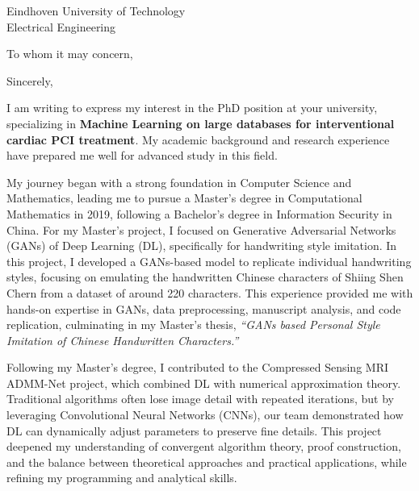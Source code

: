 \documentclass[11pt,a4paper, final]{moderncv}
\newcommand{\spacesubsection}{\vspace{0.2cm}}
\begin{document}
{Eindhoven University of Technology\\
Electrical Engineering}
\date{\today}
\opening{To whom it may concern,}
\closing{Sincerely,}
\makelettertitle
I am writing to express my interest in the PhD position at your university, 
specializing in \textbf{Machine Learning on large databases for interventional cardiac PCI treatment}. 
My academic background and research experience have prepared me well for advanced study in this field. 

My journey began with a strong foundation in Computer Science and Mathematics, 
leading me to pursue a Master's degree in Computational Mathematics in 2019, 
following a Bachelor's degree in Information Security in China. 
For my Master's project, I focused on Generative Adversarial Networks (GANs) of Deep Learning (DL), 
specifically for handwriting style imitation. 
In this project, I developed a GANs-based model to replicate individual handwriting styles, 
focusing on emulating the handwritten Chinese characters of Shiing Shen Chern from a dataset of around 220 characters. 
This experience provided me with hands-on expertise in GANs, 
data preprocessing, manuscript analysis, and code replication, 
culminating in my Master's thesis, \emph{``GANs based Personal Style Imitation of Chinese Handwritten Characters.''}

Following my Master's degree, 
I contributed to the Compressed Sensing MRI ADMM-Net project, 
which combined DL with numerical approximation theory. 
Traditional algorithms often lose image detail with repeated iterations, 
but by leveraging Convolutional Neural Networks (CNNs), 
our team demonstrated how DL can dynamically adjust parameters to preserve fine details. 
This project deepened my understanding of convergent algorithm theory, proof construction, 
and the balance between theoretical approaches and practical applications, 
while refining my programming and analytical skills.
\end{document}
